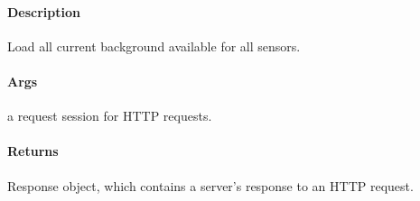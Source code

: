\documentclass[letterpaper,10pt,english]{sphinxmanual}
\begin{document}

\begin{fulllineitems}
\label{\detokenize{gemini_perception_API:gemini_perception_API.get_underlay_map}}
\pysigstartsignatures
{}
\pysigstopsignatures
\end{fulllineitems}


\begin{fulllineitems}
\label{\detokenize{gemini_perception_API:gemini_perception_API.load_backgrounds}}
\pysigstartsignatures
{}
\pysigstopsignatures

\paragraph{Description}
\label{\detokenize{gemini_perception_API:id23}}
\sphinxAtStartPar
Load all current background available for all sensors.


\paragraph{Args}
\label{\detokenize{gemini_perception_API:id24}}\begin{description}
\sphinxAtStartPar
a request session for HTTP requests.

\end{description}


\paragraph{Returns}
\label{\detokenize{gemini_perception_API:id25}}\begin{description}
\sphinxAtStartPar
Response object, which contains a server’s response to an HTTP request.

\end{description}

\end{fulllineitems}
\end{document}
